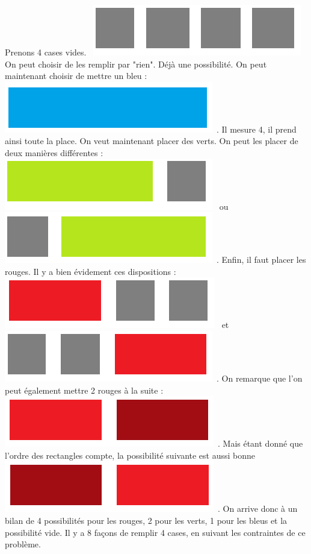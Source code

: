 \documentclass{article}
\begin{document}
\newline Prenons 4 cases vides. \, \includegraphics[scale = 0.2]{Images/vide.png} \, On peut choisir de les remplir par "rien". Déjà une possibilité. On peut maintenant choisir de mettre un bleu : \, \includegraphics[scale = 0.2]{Images/bleu.png} \,. Il mesure 4, il prend ainsi toute la place. On veut maintenant placer des verts. On peut les placer de deux manières différentes : \, \includegraphics[scale = 0.2]{Images/vert1.png} \, ou \, \includegraphics[scale = 0.2]{Images/vert2.png} \,. Enfin, il faut placer les rouges. Il y a bien évidement ces dispositions : \, \includegraphics[scale = 0.2]{Images/rouge1.png} \, et \, \includegraphics[scale = 0.2]{Images/rouge2.png} \,. On remarque que l'on peut également mettre 2 rouges à la suite : \, \includegraphics[scale = 0.2]{Images/rouge3.png} \,. Mais étant donné que l'ordre des rectangles compte, la possibilité suivante est aussi bonne \, \includegraphics[scale = 0.2]{Images/rouge4.png} \,. On arrive donc à un bilan de 4 possibilités pour les rouges, 2 pour les verts, 1 pour les bleus et la possibilité vide. Il y a 8 façons de remplir 4 cases, en suivant les contraintes de ce problème.
\end{document}
